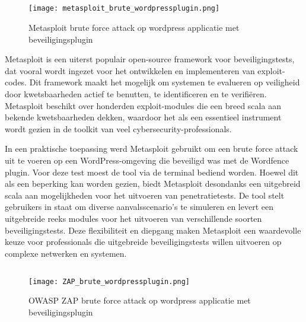 \subsection{}
\begin{figure}
    \centering
    \texttt{[image: metasploit\_brute\_wordpressplugin.png]}
    \caption[Metasploit brute force attack op wordpress applicatie met beveiligingsplugin]{Metasploit brute force attack op wordpress applicatie met beveiligingsplugin}
\end{figure}
Metasploit is een uiterst populair open-source framework voor beveiligingstests, dat vooral wordt ingezet voor het ontwikkelen en implementeren van exploit-codes. 
Dit framework maakt het mogelijk om systemen te evalueren op veiligheid door kwetsbaarheden actief te benutten, te identificeren 
en te verifiëren. Metasploit beschikt over honderden exploit-modules die een breed scala aan bekende kwetsbaarheden dekken, waardoor het als een essentieel 
instrument wordt gezien in de toolkit van veel cybersecurity-professionals.

In een praktische toepassing werd Metasploit gebruikt om een brute force attack uit te voeren op een WordPress-omgeving die beveiligd was met de Wordfence plugin. 
Voor deze test moest de tool via de terminal bediend worden. Hoewel dit als een beperking kan worden gezien, biedt Metasploit desondanks een uitgebreid scala aan 
mogelijkheden voor het uitvoeren van penetratietests. De tool stelt gebruikers in staat om diverse aanvalsscenario's te simuleren en levert een uitgebreide reeks 
modules voor het uitvoeren van verschillende soorten beveiligingstests. Deze flexibiliteit en diepgang maken Metasploit een waardevolle keuze voor professionals die 
uitgebreide beveiligingstests willen uitvoeren op complexe netwerken en systemen.

\subsection{}
\begin{figure}
    \centering
    \texttt{[image: ZAP\_brute\_wordpressplugin.png]}
    \caption[OWASP ZAP brute force attack op wordpress applicatie met beveiligingsplugin]{OWASP ZAP brute force attack op wordpress applicatie met beveiligingsplugin}
\end{figure}

